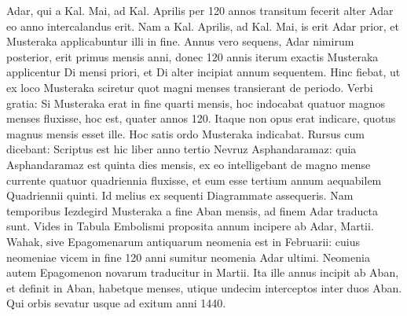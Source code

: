 Adar, qui a Kal. Mai, ad Kal. Aprilis per 120 annos transitum fecerit
alter Adar eo anno intercalandus erit.
Nam a Kal. Aprilis,
ad Kal. Mai, is erit Adar prior, et Musteraka applicabuntur illi in fine.
Annus vero sequens, Adar nimirum posterior, erit primus mensis
anni, donec 120 annis iterum exactis Musteraka applicentur Di
mensi priori, et Di alter incipiat annum sequentem.
Hinc fiebat,
ut ex loco Musteraka sciretur quot magni menses transierant de
periodo.
Verbi gratia: Si Musteraka erat in fine quarti mensis, hoc
indocabat quatuor magnos menses fluxisse, hoc est, quater annos
120.
%
Itaque non opus erat indicare, quotus magnus mensis esset
ille.
Hoc satis ordo Musteraka indicabat.
Rursus cum dicebant:
Scriptus est hic liber anno tertio Nevruz Asphandaramaz: quia Asphandaramaz
est quinta dies mensis, ex eo intelligebant de magno
mense currente quatuor quadriennia fluxisse, et eum esse tertium annum
aequabilem Quadriennii quinti.
Id melius ex sequenti Diagrammate %
assequeris.
Nam temporibus Iezdegird Musteraka a fine
Aban mensis, ad finem Adar traducta sunt.
%
%
Vides in Tabula
Embolismi proposita
annum incipere ab
Adar,  Martii.
Wahak, sive Epagomenarum
antiquarum neomenia est in
Februarii: cuius
neomeniae vicem in
fine 120 anni sumitur
neomenia Adar
ultimi.
Neomenia autem
Epagomenon novarum %
traducitur in
 Martii.
Ita ille
annus incipit ab Aban,
et definit in Aban, habetque  menses, utique undecim interceptos
inter duos Aban.
Qui orbis sevatur usque ad exitum anni
1440.
%
